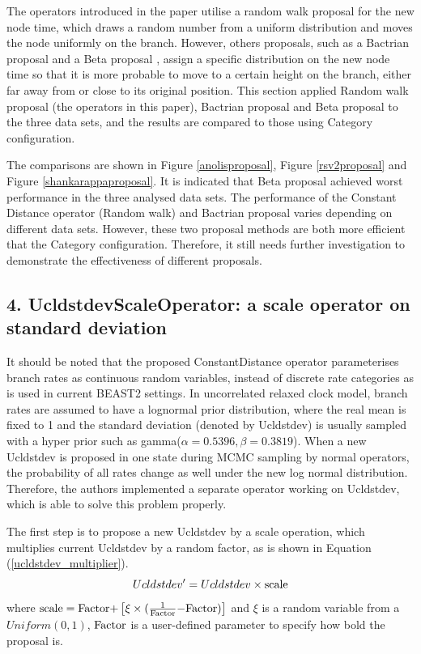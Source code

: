 \documentclass{bmcart}
\begin{document}
\begin{backmatter}
The operators introduced in the paper utilise a random walk proposal for the new node time, which draws a random number from a uniform distribution and moves the node uniformly on the branch. However, others proposals, such as a Bactrian proposal \cite{Yang19307} and a Beta proposal \cite{betaproposal}, assign a specific distribution on the new node time so that it is more probable to move to a certain height on the branch, either far away from or close to its original position. This section applied Random walk proposal (the operators in this paper), Bactrian proposal and Beta proposal to the three data sets, and the results are compared to those using Category configuration.

The comparisons are shown in Figure \ref{anolisproposal}, Figure \ref{rsv2proposal} and Figure \ref{shankarappaproposal}. It is indicated that Beta proposal achieved worst performance in the three analysed data sets. The performance of the Constant Distance operator (Random walk) and Bactrian proposal varies depending on different data sets. However, these two proposal methods are both more efficient that the Category configuration. Therefore, it still needs further investigation to demonstrate the effectiveness of different proposals.

\subsection*{4. UcldstdevScaleOperator: a scale operator on standard deviation}\label{UcldstdevScaler}

It should be noted that the proposed ConstantDistance operator parameterises branch rates as continuous random variables, instead of discrete rate categories as is used in current BEAST2 settings. In uncorrelated relaxed clock model, branch rates are assumed to have a lognormal prior distribution, where the real mean is fixed to 1 and the standard deviation (denoted by Ucldstdev) is usually sampled with a hyper prior such as gamma($\alpha = 0.5396, \beta = 0.3819$). When a new Ucldstdev is proposed in one state during MCMC sampling by normal operators, the probability of all rates change as well under the new log normal distribution. Therefore, the authors implemented a separate operator working on Ucldstdev, which is able to solve this problem properly. 

The first step is to propose a new Ucldstdev by a scale operation, which multiplies  current Ucldstdev by a random factor, as is shown in Equation (\ref{ucldstdev_multiplier}).
\begin{equation}\label{ucldstdev_multiplier}
Ucldstdev' = Ucldstdev \times {\rm{scale}}
\end{equation}
where ${\rm{scale = Factor  +  }}\left[ {\xi  \times {\rm{(}}\frac{1}{{{\rm{Factor}}}}{\rm{  -  Factor)}}} \right]$ and  $\xi$ is a random variable from a $Uniform(0,1)$,  ${\rm{Factor}}$ is a user-defined parameter to specify how bold the proposal is.


\end{backmatter}
\end{document}
